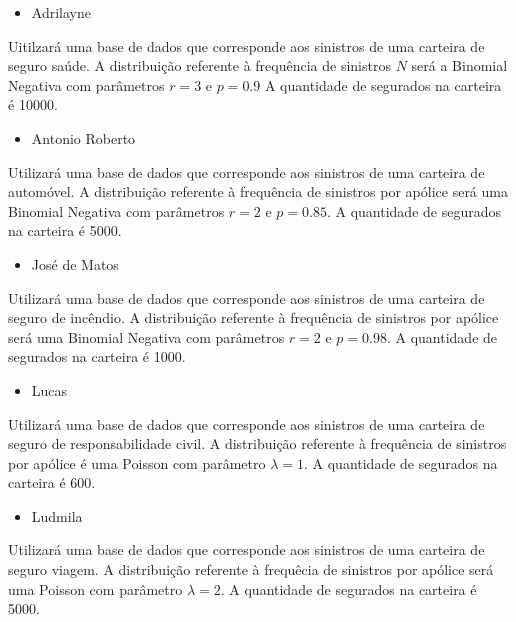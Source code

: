 \documentclass[]{article}
\providecommand{\tightlist}{%
  \setlength{\itemsep}{0pt}\setlength{\parskip}{0pt}}
\begin{document}
\begin{itemize}
\tightlist
\item
  Adrilayne
\end{itemize}

Uitilzará uma base de dados que corresponde aos sinistros de uma
carteira de seguro saúde. A distribuição referente à frequência de
sinistros \(N\) será a Binomial Negativa com parâmetros \(r=3\) e
\(p=0.9\) A quantidade de segurados na carteira é 10000.

\begin{itemize}
\tightlist
\item
  Antonio Roberto
\end{itemize}

Utilizará uma base de dados que corresponde aos sinistros de uma
carteira de automóvel. A distribuição referente à frequência de
sinistros por apólice será uma Binomial Negativa com parâmetros \(r=2\)
e \(p=0.85\). A quantidade de segurados na carteira é 5000.

\begin{itemize}
\tightlist
\item
  José de Matos
\end{itemize}

Utilizará uma base de dados que corresponde aos sinistros de uma
carteira de seguro de incêndio. A distribuição referente à frequência de
sinistros por apólice será uma Binomial Negativa com parâmetros \(r=2\)
e \(p=0.98\). A quantidade de segurados na carteira é 1000.

\begin{itemize}
\tightlist
\item
  Lucas
\end{itemize}

Utilizará uma base de dados que corresponde aos sinistros de uma
carteira de seguro de responsabilidade civil. A distribuição referente à
frequência de sinistros por apólice é uma Poisson com parâmetro
\(\lambda = 1\). A quantidade de segurados na carteira é 600.

\begin{itemize}
\tightlist
\item
  Ludmila
\end{itemize}

Utilizará uma base de dados que corresponde aos sinistros de uma
carteira de seguro viagem. A distribuição referente à frequêcia de
sinistros por apólice será uma Poisson com parâmetro \(\lambda = 2\). A
quantidade de segurados na carteira é 5000.
\end{document}
